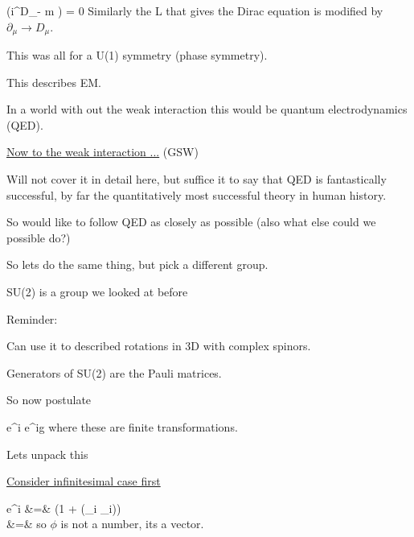 {\be
(i\gamma^\mu D_\mu  - m ) \psi = 0
\ee
Similarly the L that gives the Dirac equation is modified by $\partial_\mu \rightarrow D_\mu$.

This was all for a U(1) symmetry (phase symmetry).

This describes EM.  

In a world with out the weak interaction this would be quantum electrodynamics (QED).

\underline{Now to the weak interaction ...} (GSW)

Will not cover it in detail here, but suffice it to say that QED is fantastically successful, by far the quantitatively most successful theory in human history.

So would like to follow QED as closely as possible (also what else could we possible do?) 

So lets do the same thing, but pick a different group.

SU(2) is a group we looked at before

Reminder:
\bi
\item[-] Can use it to described rotations in 3D with complex spinors. 
\item[-] Generators of SU(2) are the Pauli matrices.
\ei
 
So now postulate

\be
\phi \rightarrow e^{i} \phi  \hspace*{0.3in}  \hspace*{0.3in} \phi \rightarrow e^{ig\vec{\alpha}\cdot\vec{\sigma}} \phi 
\ee
where these are finite transformations.

Lets unpack this

\underline{Consider infinitesimal case first}

\bea
\phi \rightarrow e^{i\epsilon \vec{\alpha} \cdot \vec{\sigma}} \phi &=& \left(1 + \epsilon(\alpha_i \sigma_i)\right)\phi \\
&=& \phi 
\eea
so $\phi$ is not a number, its a vector.

}
